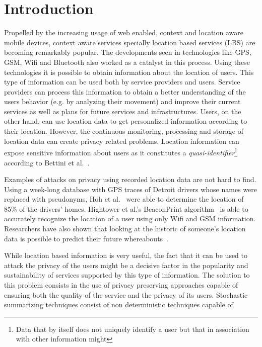 \chapter{Introduction}
\label{cha:introduction}

Propelled by the increasing usage of web enabled, context and location
aware mobile devices, context aware services specially location based
services (LBS) are becoming remarkably popular. The developments seen
in technologies like GPS, GSM, Wifi and Bluetooth also worked as a
catalyst in this process. Using these technologies it is possible to
obtain information about the location of users. This type of
information can be used both by service providers and users. Service
providers can process this information to obtain a better
understanding of the users behavior (e.g. by analyzing their movement)
and improve their current services as well as plans for future
services and infrastructures. Users, on the other hand, can use
location data to get personalized information according to their
location. However, the continuous monitoring, processing and storage
of location data can create privacy related problems. Location
information can expose sensitive information about users as it
constitutes a \emph{quasi-identifier}\footnote{Data that by itself
  does not uniquely identify a user but that in association with other
  information might} according to Bettini et
al.~\cite{bettini2005protecting}.

Examples of attacks on privacy using recorded location data are not
hard to find. Using a week-long database with GPS traces of Detroit
drivers whose names were replaced with pseudonyms, Hoh et
al.~\cite{hoh2006enhancing} were able to determine the location of
85\% of the drivers' homes. Hightower et al.'s BeaconPrint
algorithm~\cite{hightower2005learning} is able to accurately recognize
the location of a user using only Wifi and GSM
information. Researchers have also shown that looking at the historic
of someone's location data is possible to predict their future
whereabouts~\cite{krumm2006predestination,froehlich2008route}.

While location based information is very useful, the fact that it
can be used to attack the privacy of the users might be a decisive
factor in the popularity and sustainability of services supported by
this type of information.  The solution to this problem consists in
the use of privacy preserving approaches capable of ensuring both the
quality of the service and the privacy of its users.
Stochastic summarizing techniques consist of non deterministic
techniques capable of 

